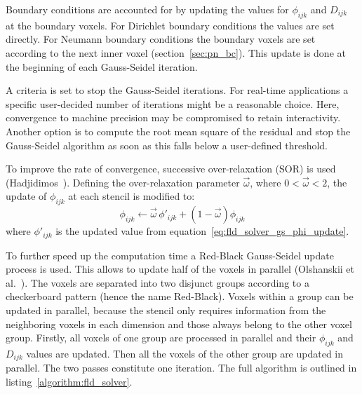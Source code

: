 Boundary conditions are accounted for by updating the values for $\phi_{ijk}$ and $D_{ijk}$ at the boundary voxels. For Dirichlet boundary conditions the values are set directly. For Neumann boundary conditions the boundary voxels are set according to the next inner voxel (section~\ref{sec:pn_bc}). This update is done at the beginning of each Gauss-Seidel iteration.

A criteria is set to stop the Gauss-Seidel iterations. For real-time applications a specific user-decided number of iterations might be a reasonable choice. Here, convergence to machine precision may be compromised to retain interactivity. Another option is to compute the root mean square of the residual and stop the Gauss-Seidel algorithm as soon as this falls below a user-defined threshold.

To improve the rate of convergence, successive over-relaxation (SOR) is used (Hadjidimos~\cite{Hadjidimos00}). Defining the over-relaxation parameter $\vec{\omega}$, where $0<\vec{\omega}<2$, the update of $\phi_{ijk}$ at each stencil is modified to:
\begin{equation}
\label{eq:fld_solver_sor_update}
\phi_{ijk} \leftarrow \vec{\omega} \,\phi'_{ijk} + (1-\vec{\omega})\phi_{ijk} 
\end{equation}
where $\phi'_{ijk}$ is the updated value from equation~\ref{eq:fld_solver_gs_phi_update}.

To further speed up the computation time a Red-Black Gauss-Seidel update process is used. This allows to update half of the voxels in parallel (Olshanskii et al.~\cite{Olshanskii14}). The voxels are separated into two disjunct groups according to a checkerboard pattern (hence the name Red-Black). Voxels within a group can be updated in parallel, because the stencil only requires information from the neighboring voxels in each dimension and those always belong to the other voxel group. Firstly, all voxels of one group are processed in parallel and their $\phi_{ijk}$ and $D_{ijk}$ values are updated. Then all the voxels of the other group are updated in parallel. The two passes constitute one iteration. The full algorithm is outlined in listing~\ref{algorithm:fld_solver}.



